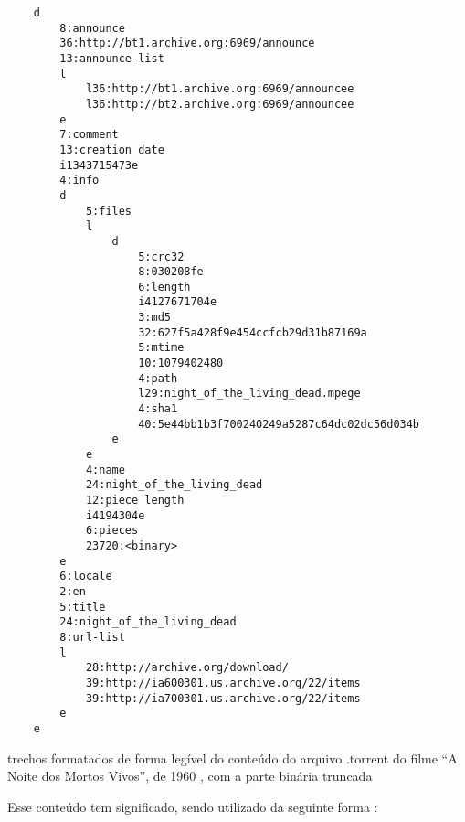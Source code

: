 \begin{listing}[H]
    \begin{verbatim}
    d
        8:announce
        36:http://bt1.archive.org:6969/announce
        13:announce-list
        l
            l36:http://bt1.archive.org:6969/announcee
            l36:http://bt2.archive.org:6969/announcee
        e
        7:comment
        13:creation date
        i1343715473e
        4:info
        d
            5:files
            l
                d
                    5:crc32
                    8:030208fe
                    6:length
                    i4127671704e
                    3:md5
                    32:627f5a428f9e454ccfcb29d31b87169a
                    5:mtime
                    10:1079402480
                    4:path
                    l29:night_of_the_living_dead.mpege
                    4:sha1
                    40:5e44bb1b3f700240249a5287c64dc02dc56d034b
                e
            e
            4:name
            24:night_of_the_living_dead
            12:piece length
            i4194304e
            6:pieces
            23720:<binary>
        e
        6:locale
        2:en
        5:title
        24:night_of_the_living_dead
        8:url-list
        l
            28:http://archive.org/download/
            39:http://ia600301.us.archive.org/22/items
            39:http://ia700301.us.archive.org/22/items
        e
    e
    \end{verbatim}
    \caption{trechos formatados de forma legível do conteúdo do arquivo .torrent do
    filme ``A Noite dos Mortos Vivos'', de 1960 \cite{torrent-file}, com a parte
    binária truncada}
    \label{lst:torrent-file-code}
\end{listing}

Esse conteúdo tem significado, sendo utilizado da seguinte forma
\cite{wikitheory:bencoding}:

